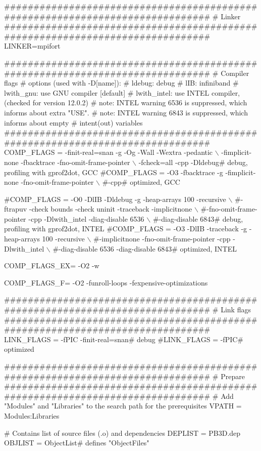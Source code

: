 \begin{DoxyCodeInclude}
##############################################################################
#   Linker
##############################################################################
LINKER=mpifort


##############################################################################
#   Compiler flags
#   options (used with -D[name]):
#       ldebug: debug
#       lIB: infiniband
#       lwith\_gnu: use GNU compiler [default]
#       lwith\_intel: use INTEL compiler, (checked for version 12.0.2)
#   note: INTEL warning 6536 is suppressed, which informs about extra "USE".
#   note: INTEL warning 6843 is suppressed, which informs about empty
#       intent(out) variables
##############################################################################
COMP\_FLAGS = -finit-real=snan -g -Og -Wall -Wextra -pedantic \(\backslash\)
    -fimplicit-none -fbacktrace -fno-omit-frame-pointer \(\backslash\)
    -fcheck=all -cpp -Dldebug# debug, profiling with gprof2dot, GCC
#COMP\_FLAGS = -O3 -fbacktrace -g -fimplicit-none -fno-omit-frame-pointer \(\backslash\)
    #-cpp# optimized, GCC

#COMP\_FLAGS = -O0 -DlIB -Dldebug -g -heap-arrays 100 -recursive \(\backslash\)
    #-ftrapuv -check bounds -check uninit -traceback -implicitnone \(\backslash\)
    #-fno-omit-frame-pointer -cpp -Dlwith\_intel -diag-disable 6536 \(\backslash\)
    #-diag-disable 6843# debug, profiling with gprof2dot, INTEL
#COMP\_FLAGS = -O3 -DlIB -traceback -g -heap-arrays 100 -recursive \(\backslash\)
    #-implicitnone -fno-omit-frame-pointer -cpp -Dlwith\_intel \(\backslash\)
    #-diag-disable 6536 -diag-disable 6843# optimized, INTEL

COMP\_FLAGS\_EX= -O2 -w

COMP\_FLAGS\_F= -O2 -funroll-loops -fexpensive-optimizations


##############################################################################
#   Link flags
##############################################################################
LINK\_FLAGS = -fPIC -finit-real=snan# debug
#LINK\_FLAGS = -fPIC# optimized


##############################################################################
#   Prepare
##############################################################################
# Add "Modules" and "Libraries" to the search path for the prerequisites
VPATH = Modules:Libraries

# Contains list of source files (.o) and dependencies
DEPLIST = PB3D.dep
OBJLIST = ObjectList# defines "ObjectFiles"


\end{DoxyCodeInclude}
